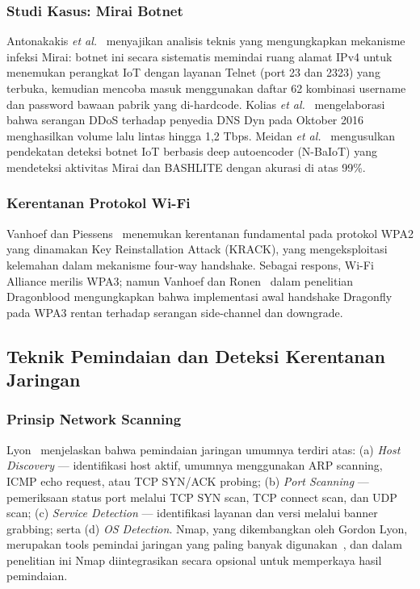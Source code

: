 \subsubsection{Studi Kasus: Mirai Botnet}
Antonakakis \textit{et al.}~\cite{b1} menyajikan analisis teknis yang
mengungkapkan mekanisme infeksi Mirai: botnet ini secara sistematis memindai
ruang alamat IPv4 untuk menemukan perangkat IoT dengan layanan Telnet (port 23
dan 2323) yang terbuka, kemudian mencoba masuk menggunakan daftar 62 kombinasi
username dan password bawaan pabrik yang di-hardcode. Kolias
\textit{et al.}~\cite{b10} mengelaborasi bahwa serangan DDoS terhadap penyedia
DNS Dyn pada Oktober 2016 menghasilkan volume lalu lintas hingga 1,2 Tbps.
Meidan \textit{et al.}~\cite{b22} mengusulkan pendekatan deteksi botnet IoT
berbasis deep autoencoder (N-BaIoT) yang mendeteksi aktivitas Mirai dan
BASHLITE dengan akurasi di atas 99\%.

\subsubsection{Kerentanan Protokol Wi-Fi}
Vanhoef dan Piessens~\cite{b11} menemukan kerentanan fundamental pada protokol
WPA2 yang dinamakan Key Reinstallation Attack (KRACK), yang mengeksploitasi
kelemahan dalam mekanisme four-way handshake. Sebagai respons, Wi-Fi Alliance
merilis WPA3; namun Vanhoef dan Ronen~\cite{b12} dalam penelitian Dragonblood
mengungkapkan bahwa implementasi awal handshake Dragonfly pada WPA3 rentan
terhadap serangan side-channel dan downgrade.

\subsection{Teknik Pemindaian dan Deteksi Kerentanan Jaringan}

\subsubsection{Prinsip Network Scanning}
Lyon~\cite{b13} menjelaskan bahwa pemindaian jaringan umumnya terdiri atas:
(a) \textit{Host Discovery} --- identifikasi host aktif, umumnya menggunakan
ARP scanning, ICMP echo request, atau TCP SYN/ACK probing; (b) \textit{Port
Scanning} --- pemeriksaan status port melalui TCP SYN scan, TCP connect scan,
dan UDP scan; (c) \textit{Service Detection} --- identifikasi layanan dan versi
melalui banner grabbing; serta (d) \textit{OS Detection}. Nmap, yang
dikembangkan oleh Gordon Lyon, merupakan tools pemindai jaringan yang paling
banyak digunakan~\cite{b13}, dan dalam penelitian ini Nmap diintegrasikan
secara opsional untuk memperkaya hasil pemindaian.

